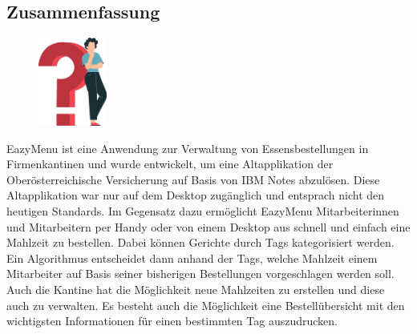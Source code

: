\begin{spacing}{1}
    \chapter*{Zusammenfassung}
\end{spacing}
\begin{figure}
    \begin{center}
      \includegraphics[width=0.2\textwidth]{pics/question_mark.png}
    \end{center}
\end{figure}
\author{David Ignjatovic}
EazyMenu ist eine Anwendung zur Verwaltung von Essensbestellungen in Firmenkantinen und wurde entwickelt, um eine Altapplikation der Oberösterreichische Versicherung auf Basis von IBM Notes abzulösen. 
Diese Altapplikation war nur auf dem Desktop zugänglich und entsprach nicht den heutigen Standards. 
Im Gegensatz dazu ermöglicht EazyMenu Mitarbeiterinnen und Mitarbeitern per Handy oder von einem Desktop aus schnell und einfach eine Mahlzeit zu bestellen. 
Dabei können Gerichte durch Tags kategorisiert werden. Ein Algorithmus entscheidet dann anhand der Tags, welche Mahlzeit einem Mitarbeiter auf Basis seiner bisherigen Bestellungen vorgeschlagen werden soll.
Auch die Kantine hat die Möglichkeit neue Mahlzeiten zu erstellen und diese auch zu verwalten. 
Es besteht auch die Möglichkeit eine Bestellübersicht mit den wichtigsten Informationen für einen bestimmten Tag auszudrucken.